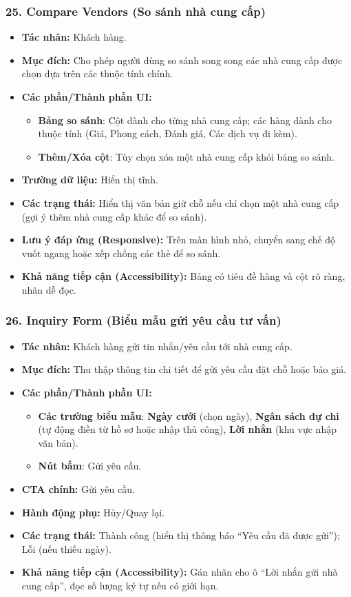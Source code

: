 \documentclass[11pt,a4paper]{article}
\begin{document}
\subsubsection{25. Compare Vendors (So sánh nhà cung cấp)}
\begin{itemize}
    \item \textbf{Tác nhân:} Khách hàng.
    \item \textbf{Mục đích:} Cho phép người dùng so sánh song song các nhà cung cấp được chọn dựa trên các thuộc tính chính.
    \item \textbf{Các phần/Thành phần UI:}
    \begin{itemize}
        \item \textbf{Bảng so sánh}: Cột dành cho từng nhà cung cấp; các hàng dành cho thuộc tính (Giá, Phong cách, Đánh giá, Các dịch vụ đi kèm).
        \item \textbf{Thêm/Xóa cột}: Tùy chọn xóa một nhà cung cấp khỏi bảng so sánh.
    \end{itemize}
    \item \textbf{Trường dữ liệu:} Hiển thị tĩnh.
    \item \textbf{Các trạng thái:} Hiển thị văn bản giữ chỗ nếu chỉ chọn một nhà cung cấp (gợi ý thêm nhà cung cấp khác để so sánh).
    \item \textbf{Lưu ý đáp ứng (Responsive):} Trên màn hình nhỏ, chuyển sang chế độ vuốt ngang hoặc xếp chồng các thẻ để so sánh.
    \item \textbf{Khả năng tiếp cận (Accessibility):} Bảng có tiêu đề hàng và cột rõ ràng, nhãn dễ đọc.
\end{itemize}

\subsubsection{26. Inquiry Form (Biểu mẫu gửi yêu cầu tư vấn)}
\begin{itemize}
    \item \textbf{Tác nhân:} Khách hàng gửi tin nhắn/yêu cầu tới nhà cung cấp.
    \item \textbf{Mục đích:} Thu thập thông tin chi tiết để gửi yêu cầu đặt chỗ hoặc báo giá.
    \item \textbf{Các phần/Thành phần UI:}
    \begin{itemize}
        \item \textbf{Các trường biểu mẫu}: \textbf{Ngày cưới} (chọn ngày), \textbf{Ngân sách dự chi} (tự động điền từ hồ sơ hoặc nhập thủ công), \textbf{Lời nhắn} (khu vực nhập văn bản).
        \item \textbf{Nút bấm}: Gửi yêu cầu.
    \end{itemize}
    \item \textbf{CTA chính:} Gửi yêu cầu.
    \item \textbf{Hành động phụ:} Hủy/Quay lại.
    \item \textbf{Các trạng thái:} Thành công (hiển thị thông báo ``Yêu cầu đã được gửi''); Lỗi (nếu thiếu ngày).
    \item \textbf{Khả năng tiếp cận (Accessibility):} Gán nhãn cho ô ``Lời nhắn gửi nhà cung cấp'', đọc số lượng ký tự nếu có giới hạn.
\end{itemize}
\end{document}

